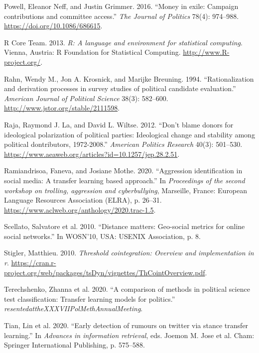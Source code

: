 \documentclass[12pt,]{article}
\begin{document}
\begin{CSLReferences}{1}{0}
{\leavevmode{}%
Powell, Eleanor Neff, and Justin Grimmer. 2016. {``Money in exile:
Campaign contributions and committee access.''} \emph{The Journal of
Politics} 78(4): 974--988. \url{https://doi.org/10.1086/686615}.

\leavevmode{}%
R Core Team. 2013. \emph{R: A language and environment for statistical
computing}. Vienna, Austria: R Foundation for Statistical Computing.
\url{http://www.R-project.org/}.

\leavevmode{}%
Rahn, Wendy M., Jon A. Krosnick, and Marijke Breuning. 1994.
{``Rationalization and derivation processes in survey studies of
political candidate evaluation.''} \emph{American Journal of Political
Science} 38(3): 582--600. \url{http://www.jstor.org/stable/2111598}.

\leavevmode{}%
Raja, Raymond J. La, and David L. Wiltse. 2012. {``Don't blame donors
for ideological polarization of political parties: Ideological change
and stability among political dontributors, 1972-2008.''} \emph{American
Politics Research} 40(3): 501--530.
\url{https://www.aeaweb.org/articles?id=10.1257/jep.28.2.51}.

\leavevmode{}%
Ramiandrisoa, Faneva, and Josiane Mothe. 2020. {``Aggression
identification in social media: A transfer learning based approach.''}
In \emph{Proceedings of the second workshop on trolling, aggression and
cyberbullying}, Marseille, France: European Language Resources
Association (ELRA), p. 26--31.
\url{https://www.aclweb.org/anthology/2020.trac-1.5}.

\leavevmode{}%
Scellato, Salvatore et al. 2010. {``Distance matters: Geo-social metrics
for online social networks.''} In WOSN'10, USA: USENIX Association, p.
8.

\leavevmode{}%
Stigler, Matthieu. 2010. \emph{Threshold cointegration: Overview and
implementation in r}.
\url{https://cran.r-project.org/web/packages/tsDyn/vignettes/ThCointOverview.pdf}.

\leavevmode{}%
Terechshenko, Zhanna et al. 2020. {``A comparison of methods in
political science test classification: Transfer learning models for
politics.''} \emph{resentedattheXXXVIIPolMethAnnualMeeting}.

\leavevmode{}%
Tian, Lin et al. 2020. {``Early detection of rumours on twitter via
stance transfer learning.''} In \emph{Advances in information
retrieval}, eds. Joemon M. Jose et al. Cham: Springer International
Publishing, p. 575--588.

}
\end{CSLReferences}
\end{document}
